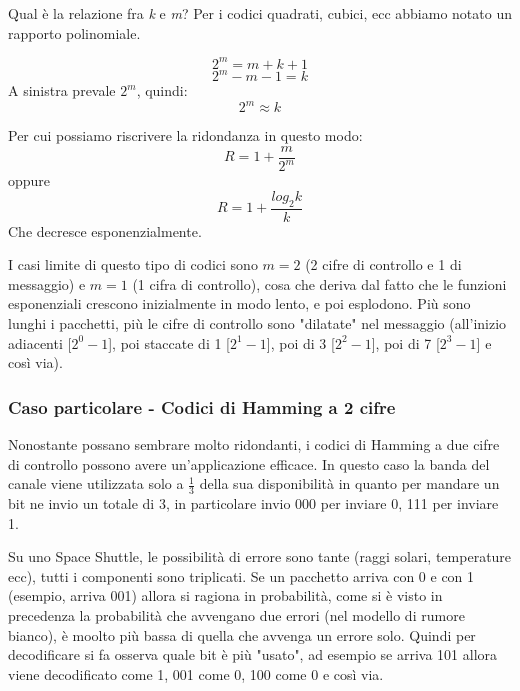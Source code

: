 Qual è la relazione fra \textit{k} e \textit{m}? Per i codici quadrati, cubici, ecc abbiamo notato un rapporto polinomiale.

\begin{equation*}
2^m=m+k+1
\end{equation*}
\begin{equation*}
2^m-m-1 = k
\end{equation*}
A sinistra prevale $2^m$, quindi:
\begin{equation*}
2^m \approx k
\end{equation*}

Per cui possiamo riscrivere la ridondanza in questo modo:
\begin{equation*}
R = 1 + \frac{m}{2^m}
\end{equation*}
oppure
\begin{equation*}
R = 1 + \frac{log_2k}{k}
\end{equation*}
Che decresce esponenzialmente.

I casi limite di questo tipo di codici sono $m=2$ (2 cifre di controllo e 1 di messaggio) e $m=1$ (1 cifra di controllo), cosa che deriva dal fatto che le funzioni esponenziali crescono inizialmente in modo lento, e poi esplodono.
Più sono lunghi i pacchetti, più le cifre di controllo sono "dilatate" nel messaggio (all'inizio adiacenti [$2^0 - 1$], poi staccate di 1 [$2^1 - 1$], poi di 3 [$2^2 - 1$], poi di 7 [$2^3 - 1$] e così via).

\subsubsection*{Caso particolare - Codici di Hamming a 2 cifre}
Nonostante possano sembrare molto ridondanti, i codici di Hamming a due cifre di controllo possono avere un'applicazione efficace.
In questo caso la banda del canale viene utilizzata solo a $\frac{1}{3}$ della sua disponibilità in quanto per mandare un bit ne invio un totale di 3, in particolare invio 000 per inviare 0, 111 per inviare 1.

Su uno Space Shuttle, le possibilità di errore sono tante (raggi solari, temperature ecc), tutti i componenti sono triplicati. 
Se un pacchetto arriva con 0 e con 1 (esempio, arriva 001) allora si ragiona in probabilità, come si è visto in precedenza la probabilità che avvengano due errori (nel modello di rumore bianco), è moolto più bassa di quella che avvenga un errore solo. Quindi per decodificare si fa osserva quale bit è più "usato", ad esempio se arriva 101 allora viene decodificato come 1, 001 come 0, 100 come 0 e così via.

